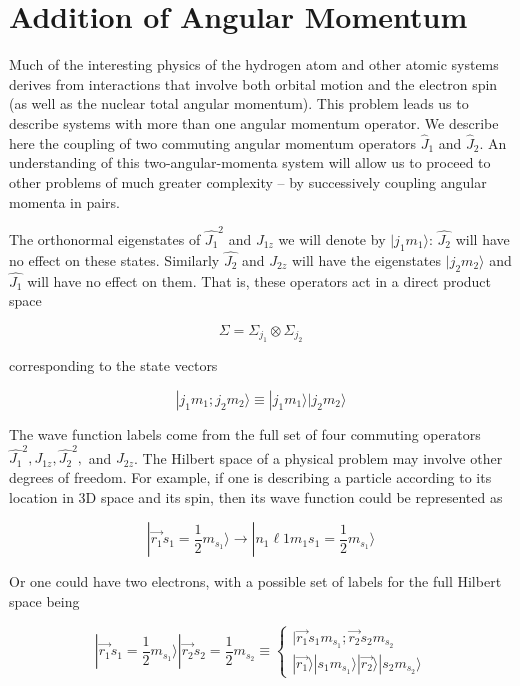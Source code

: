 
\section{Addition of Angular Momentum}

Much of the interesting physics of the hydrogen atom and other atomic systems
derives from interactions that involve both orbital motion and the electron
spin (as well as the nuclear total angular momentum). This problem leads us to
describe systems with more than one angular momentum operator. We describe here
the coupling of two commuting angular momentum operators $\hat{J}_1$ and
$\hat{J}_2$. An understanding of this two-angular-momenta system will allow us
to proceed to other problems of much greater complexity -- by successively
coupling angular momenta in pairs. 

The orthonormal eigenstates of $\hat{J_1}^2$ and $J_{1z}$ we will denote by
$|j_1m_1\rangle$: $\hat{J_2}$ will have no effect on these states. Similarly
$\hat{J_2}$ and $J_{2z}$ will have the eigenstates $|j_2m_2\rangle$ and
$\hat{J_1}$ will have no effect on them. That is, these operators act in
a direct product space 

\[
  \Sigma = \Sigma_{j_1} \otimes \Sigma_{j_2}
\] \vspace{3px}

corresponding to the state vectors 

\[
|j_1m_1; j_2m_2 \rangle \equiv |j_1m_1\rangle |j_2m_2\rangle
\] \vspace{3px}

The wave function labels come from the full set of four commuting operators
$\hat{J_1}^2, J_{1z}, \hat{J_2}^2,$ and $J_{2z}$. The Hilbert space of
a physical problem may involve other degrees of freedom. For example, if one is
describing a particle according to its location in 3D space and its spin, then
its wave function could be represented as 

\[
  | \vec{r_1} s_1 = \frac{1}{2}m_{s_1} \rangle \rightarrow |n_1\ell 1 m_1 s_1
  = \frac{1}{2} m_{s_1} \rangle 
\] \vspace{3px}

Or one could have two electrons, with a possible set of labels for the full
Hilbert space being 

\[
  | \vec{r_1} s_1 = \frac{1}{2} m_{s_1} \rangle | \vec{r_2} s_2
  = \frac{1}{2}m_{s_2} \equiv \begin{cases}
    |\vec{r_1}s_1m_{s_1}; \vec{r_2}s_2m_{s_2} \\ |\vec{r_1}\rangle |
    s_1m_{s_1}\rangle |\vec{r_2}\rangle |s_2m_{s_2}\rangle
  \end{cases} 
\] \vspace{3px}


